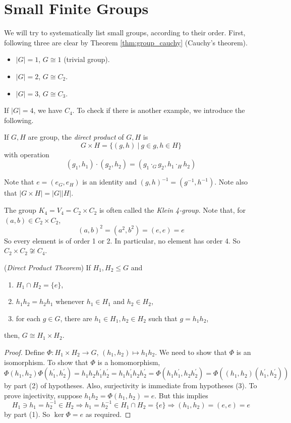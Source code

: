 \documentclass[10pt, a4paper, twoside]{report}
\begin{document}
\section{Small Finite Groups}
We will try to systematically list small groups, according to their order. First, following three are clear by Theorem \ref{thm:group_cauchy} (Cauchy's theorem).
\begin{itemize}
    \item \(|G|=1\), \(G\cong 1\) (trivial group).
    \item \(|G|=2\), \(G\cong C_2\).
    \item \(|G|=3\), \(G\cong C_3\).
\end{itemize}
If \(|G|=4\), we have \(C_4\). To check if there is another example, we introduce the following.
\begin{definition}
    If \(G,H\) are group, the \emph{direct product} of \(G,H\) is 
    \[G\times H=\{(g,h)\:|\:g\in g,h\in H\}\]
    with operation \[(g_1,h_1)\cdot (g_2,h_2)=(g_1\cdot_Gg_2,h_1\cdot_H h_2)\]
\end{definition}
Note that \(e=(e_G,e_H)\) is an identity and \((g,h)^{-1}=(g^{-1},h^{-1})\). Note also that \(|G\times H|=|G||H|\).
\begin{example}
    The group \(K_4=V_4=C_2\times C_2\) is often called the \emph{Klein 4-group}. Note that, for \((a,b)\in C_2\times C_2\), 
    \[(a,b)^2=(a^2,b^2)=(e,e)=e\]
    So every element is of order 1 or 2. In particular, no element has order 4. So \(C_2\times C_2\not\cong C_4\).
\end{example}
\begin{theorem}
    (\emph{Direct Product Theorem}) If \(H_1,H_2\leq G\) and 
    \begin{enumerate}
        \item \(H_1\cap H_2=\{e\}\),
        \item \(h_1h_2=h_2h_1\) whenever \(h_1\in H_1\) and \(h_2\in H_2\),
        \item for each \(g\in G\), there are \(h_1\in H_1,h_2\in H_2\) such that \(g=h_1h_2\),
    \end{enumerate}
    then, \(G\cong H_1\times H_2\).
    \label{thm:dpt}
\end{theorem}
\begin{proof}
    Define \(\Phi:H_1\times H_2\to G\), \((h_1,h_2)\mapsto h_1h_2\). We need to show that \(\Phi\) is an isomorphism. To show that \(\Phi\) is a homomorphism, 
    \[\Phi(h_1,h_2)\Phi(h_1^\prime,h_2^\prime)=h_1h_2h_1^\prime h_2^\prime=h_1h_1^\prime h_2h_2^\prime=\Phi(h_1h_1^\prime,h_2h_2^\prime)=\Phi((h_1,h_2)(h_1^\prime,h_2^\prime))\]
    by part (2) of hypotheses. Also, surjectivity is immediate from hypotheses (3). To prove injectivity, suppose \(h_1h_2=\Phi(h_1,h_2)=e\). But this implies 
    \[H_1\ni h_1=h_2^{-1}\in H_2\Rightarrow h_1=h_2^{-1}\in H_1\cap H_2=\{e\}\Rightarrow (h_1,h_2)=(e,e)=e\]
    by part (1). So \(\ker\Phi=e\) as required.
\end{proof}
\end{document}
